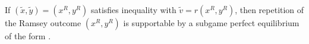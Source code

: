 


If $(\tilde x,\tilde y) = (x^R,y^R)$ satisfies inequality 
with $\tilde v = r(x^R,y^R)$, then repetition of the Ramsey outcome
$(x^R,y^R)$ is supportable by a subgame perfect equilibrium of the
form .

\newpage

